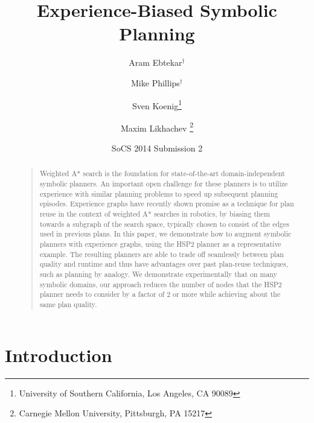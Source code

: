 \documentclass[letterpaper]{article}
\begin{document}
%
\title{Experience-Biased Symbolic Planning}
\author{Aram Ebtekar$^\dagger$ \and Mike Phillips$^\dagger$ \and Sven Koenig\thanks{University of Southern California, Los Angeles, CA 90089} \and Maxim Likhachev%
\thanks{Carnegie Mellon University, Pittsburgh, PA 15217}%
%
}
\author{SoCS 2014 Submission 2}%
\maketitle
\begin{abstract}
\begin{quote}
Weighted A* search is the foundation for state-of-the-art domain-independent symbolic planners.
An important open challenge for these planners is to utilize experience with similar planning problems to speed up subsequent planning episodes.
Experience graphs have recently shown promise as a technique for plan reuse in the context of weighted A* searches in robotics, by biasing them towards a subgraph of the search space, typically chosen to consist of the edges used in previous plans.
In this paper, we demonstrate how to augment symbolic planners with
experience graphs, using the HSP2 planner as a representative
example.
The resulting planners are able to trade off seamlessly
between plan quality and runtime and thus have advantages over past
plan-reuse techniques, such as planning by analogy.
We demonstrate experimentally that on many symbolic domains, our approach reduces the number of nodes that the HSP2 planner needs to consider by a factor of 2 or more while achieving about the same plan quality.
\end{quote}
\end{abstract}

\section{Introduction}
\end{document}
